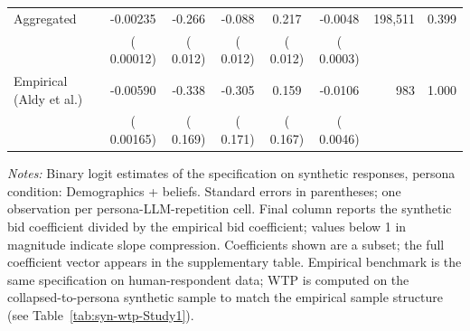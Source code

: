 \begin{table}[H]
\begin{threeparttable}
\begin{tabular}{lcccccrr}
\midrule
Aggregated &  -0.00235 &  -0.266 &  -0.088 &   0.217 & -0.0048 &   198,511 &  0.399 \\
 & (  0.00012) & (  0.012) & (  0.012) & (  0.012) & ( 0.0003) & & \\
\midrule
Empirical (Aldy et al.) &  -0.00590 &  -0.338 &  -0.305 &   0.159 & -0.0106 &       983 & 1.000 \\
 & (  0.00165) & (  0.169) & (  0.171) & (  0.167) & ( 0.0046) & & \\
\bottomrule
\end{tabular}
\begin{tablenotes}\footnotesize
\item \textit{Notes:} Binary logit estimates of the \textcite{Aldy2012} specification on synthetic responses, persona condition: Demographics + beliefs. 
Standard errors in parentheses; one observation per persona-LLM-repetition cell. 
Final column reports the synthetic bid coefficient divided by the empirical bid coefficient; values below 1 in magnitude indicate slope compression. 
Coefficients shown are a subset; the full coefficient vector appears in the supplementary table. 
Empirical benchmark is the same specification on \textcite{Aldy2012} human-respondent data; WTP is computed on the collapsed-to-persona synthetic sample to match the empirical sample structure (see Table~\ref{tab:syn-wtp-Study1}).
\end{tablenotes}
\end{threeparttable}
\end{table}
